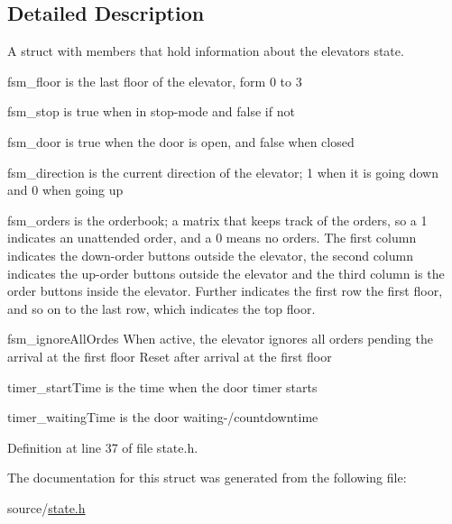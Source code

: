 \subsection{Detailed Description}
A struct with members that hold information about the elevators state. 

fsm\+\_\+floor is the last floor of the elevator, form 0 to 3

fsm\+\_\+stop is true when in stop-\/mode and false if not

fsm\+\_\+door is true when the door is open, and false when closed

fsm\+\_\+direction is the current direction of the elevator; 1 when it is going down and 0 when going up

fsm\+\_\+orders is the orderbook; a matrix that keeps track of the orders, so a 1 indicates an unattended order, and a 0 means no orders. The first column indicates the down-\/order buttons outside the elevator, the second column indicates the up-\/order buttons outside the elevator and the third column is the order buttons inside the elevator. Further indicates the first row the first floor, and so on to the last row, which indicates the top floor.

fsm\+\_\+ignore\+All\+Ordes When active, the elevator ignores all orders pending the arrival at the first floor Reset after arrival at the first floor

timer\+\_\+start\+Time is the time when the door timer starts

timer\+\_\+waiting\+Time is the door waiting-\//countdowntime 

Definition at line 37 of file state.\+h.



The documentation for this struct was generated from the following file\+:\begin{DoxyCompactItemize}
\item 
source/\hyperlink{state_8h}{state.\+h}\end{DoxyCompactItemize}
